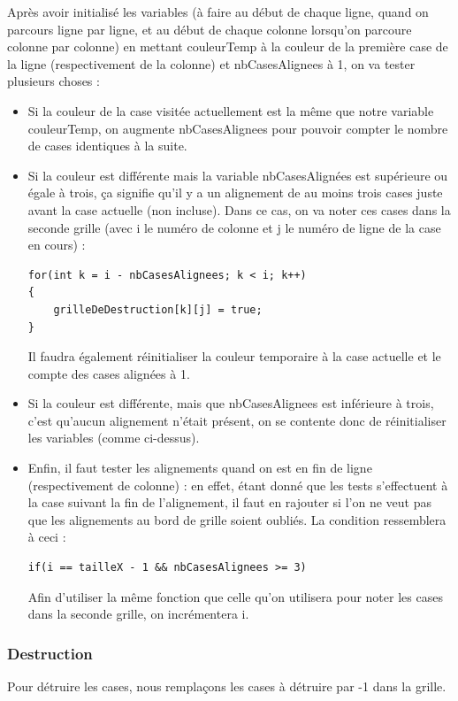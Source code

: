 Après avoir initialisé les variables (à faire au début de chaque ligne, quand on parcours ligne par ligne, et au début de chaque colonne lorsqu'on parcoure colonne par colonne)
en mettant couleurTemp à la couleur de la première case de la ligne (respectivement de la colonne) et nbCasesAlignees à 1,
on va tester plusieurs choses :
\begin{itemize}
\item
	Si la couleur de la case visitée actuellement est la même que notre variable couleurTemp, on augmente nbCasesAlignees pour pouvoir compter le nombre de cases identiques à la suite.
\item
	Si la couleur est différente mais la variable nbCasesAlignées est supérieure ou égale à trois, ça signifie qu'il y a un alignement de au moins trois cases juste avant la case actuelle (non incluse).
	Dans ce cas, on va noter ces cases dans la seconde grille (avec i le numéro de colonne et j le numéro de ligne de la case en cours) :
\begin{lstlisting}
for(int k = i - nbCasesAlignees; k < i; k++)
{
	grilleDeDestruction[k][j] = true;
}
\end{lstlisting}
Il faudra également réinitialiser la couleur temporaire à la case actuelle et le compte des cases alignées à 1.
\item
	Si la couleur est différente, mais que nbCasesAlignees est inférieure à trois, c'est qu'aucun alignement n'était présent, on se contente donc de réinitialiser les variables (comme ci-dessus).
\item
	Enfin, il faut tester les alignements quand on est en fin de ligne (respectivement de colonne) : en effet, étant donné que les tests s'effectuent à la case suivant la fin de l'alignement, il faut en rajouter si
	l'on ne veut pas que les alignements au bord de grille soient oubliés.
	La condition ressemblera à ceci :
\begin{lstlisting}
if(i == tailleX - 1 && nbCasesAlignees >= 3)
\end{lstlisting}
	Afin d'utiliser la même fonction que celle qu'on utilisera pour noter les cases dans la seconde grille, on incrémentera i.
\end{itemize}

\subsubsection{Destruction}

Pour détruire les cases, nous remplaçons les cases à détruire par -1 dans la grille.

